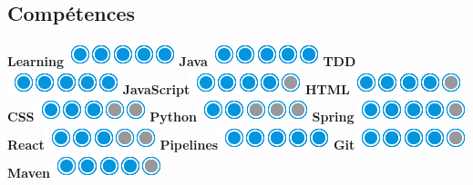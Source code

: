 \documentclass[]{friggeri-cv}
\begin{document}
\begin{aside}
  \section{Compétences}
  \hspace{1cm}
    \textbf{Learning}\includegraphics[scale=0.40]{img/5puces.png}
    \textbf{Java}\includegraphics[scale=0.40]{img/5puces.png}
    \textbf{TDD}\includegraphics[scale=0.40]{img/5puces.png}
    \textbf{JavaScript}\includegraphics[scale=0.40]{img/4puces.png}
    \textbf{HTML}\includegraphics[scale=0.40]{img/4puces.png}
    \textbf{CSS}\includegraphics[scale=0.40]{img/3puces.png}
    \textbf{Python}\includegraphics[scale=0.40]{img/2puces.png}
    \textbf{Spring}\includegraphics[scale=0.40]{img/4puces.png}
    \textbf{React}\includegraphics[scale=0.40]{img/3puces.png}
    \textbf{Pipelines}\includegraphics[scale=0.40]{img/5puces.png}
    \textbf{Git}\includegraphics[scale=0.40]{img/4puces.png}
    \textbf{Maven}\includegraphics[scale=0.40]{img/4puces.png}

\end{aside}
\end{document}
